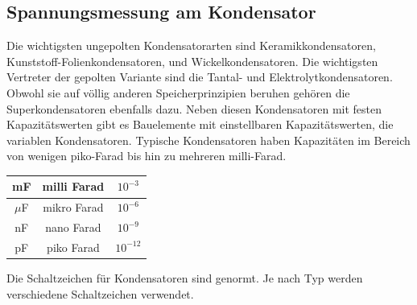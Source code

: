 \documentclass[
a4paper,     %
 headsepline, %
11pt         %
]{scrartcl}  %
\begin{document}
\subsection{Spannungsmessung am Kondensator}
Die wichtigsten ungepolten Kondensatorarten sind Keramikkondensatoren, Kunststoff-Folienkondensatoren, und Wickelkondensatoren. Die wichtigsten Vertreter der gepolten Variante sind die Tantal- und Elektrolytkondensatoren. Obwohl sie auf völlig anderen Speicherprinzipien beruhen gehören die Superkondensatoren ebenfalls dazu. Neben diesen Kondensatoren mit festen Kapazitätswerten gibt es Bauelemente mit einstellbaren Kapazitätswerten, die variablen Kondensatoren.
Typische Kondensatoren haben Kapazitäten im Bereich von wenigen piko-Farad bis hin zu mehreren milli-Farad.
\begin{center}
\begin{tabular}{ c | c | c }
    \hline
    mF  & milli Farad & $10^{-3}$ \\ \hline
    $\mu$F  & mikro Farad & $10^{-6}$ \\ \hline
    nF  & nano Farad  & $10^{-9}$ \\ \hline
    pF  & piko Farad  & $10^{-12}$ \\
    \hline
\end{tabular}
\end{center}
Die Schaltzeichen für Kondensatoren sind genormt. Je nach Typ werden verschiedene Schaltzeichen verwendet.
\begin{figure}
\centering
\def\svgwidth{\columnwidth}

\end{figure}
\end{document}
